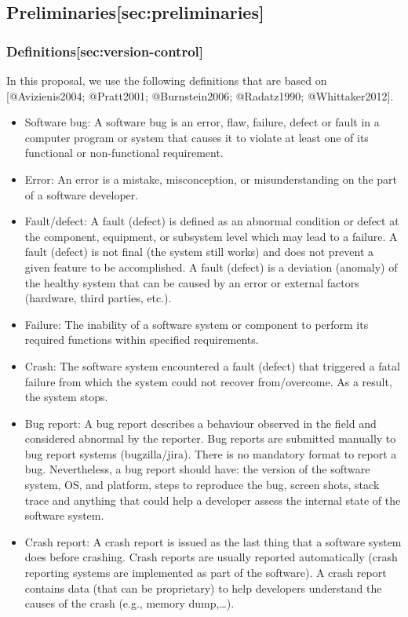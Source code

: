 \subsection{Preliminaries{[}sec:preliminaries{]}}\label{preliminariessecpreliminaries}

\subsubsection{Definitions{[}sec:version-control{]}}\label{definitionssecversion-control}

In this proposal, we use the following definitions that are based on
{[}@Avizienis2004; @Pratt2001; @Burnstein2006; @Radatz1990;
@Whittaker2012{]}.

\begin{itemize}
\item
  Software bug: A software bug is an error, flaw, failure, defect or
  fault in a computer program or system that causes it to violate at
  least one of its functional or non-functional requirement.
\item
  Error: An error is a mistake, misconception, or misunderstanding on
  the part of a software developer.
\item
  Fault/defect: A fault (defect) is defined as an abnormal condition or
  defect at the component, equipment, or subsystem level which may lead
  to a failure. A fault (defect) is not final (the system still works)
  and does not prevent a given feature to be accomplished. A fault
  (defect) is a deviation (anomaly) of the healthy system that can be
  caused by an error or external factors (hardware, third parties,
  etc.).
\item
  Failure: The inability of a software system or component to perform
  its required functions within specified requirements.
\item
  Crash: The software system encountered a fault (defect) that triggered
  a fatal failure from which the system could not recover from/overcome.
  As a result, the system stops.
\item
  Bug report: A bug report describes a behaviour observed in the field
  and considered abnormal by the reporter. Bug reports are submitted
  manually to bug report systems (bugzilla/jira). There is no mandatory
  format to report a bug. Nevertheless, a bug report should have: the
  version of the software system, OS, and platform, steps to reproduce
  the bug, screen shots, stack trace and anything that could help a
  developer assess the internal state of the software system.
\item
  Crash report: A crash report is issued as the last thing that a
  software system does before crashing. Crash reports are usually
  reported automatically (crash reporting systems are implemented as
  part of the software). A crash report contains data (that can be
  proprietary) to help developers understand the causes of the crash
  (e.g., memory dump,\ldots{}).
\end{itemize}

